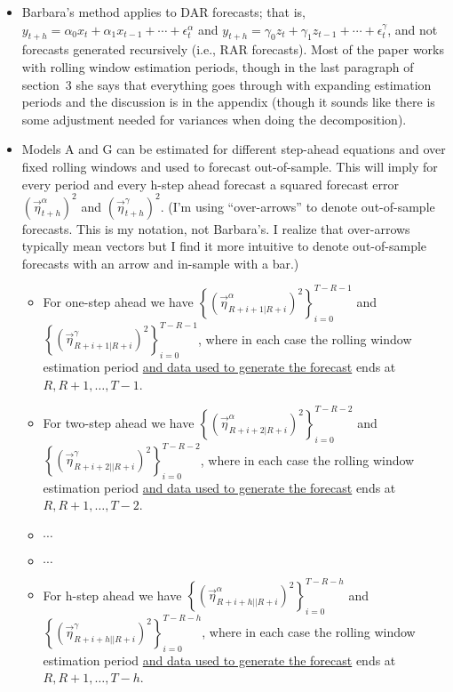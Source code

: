 \documentclass[11pt]{article}
\begin{document}
\begin{itemize}
\item Barbara's method applies to DAR forecasts; that is, $y_{t+h}=\alpha_{0}x_{t}+\alpha_{1}x_{t-1}+\cdots+\epsilon^{\alpha}_{t}$ and $y_{t+h}=\gamma_{0}z_{t}+\gamma_{1}z_{t-1}+\cdots+\epsilon^{\gamma}_{t}$, and not forecasts generated recursively (i.e., RAR forecasts).  Most of the paper works with rolling window estimation periods, though in the last paragraph of section~3 she says that everything goes through with expanding estimation periods and the discussion is in the appendix (though it sounds like there is some adjustment needed for variances when doing the decomposition).
\item Models A and G can be estimated for different step-ahead equations and over fixed rolling windows and used to forecast out-of-sample.  This will imply for every period and every h-step ahead forecast a squared forecast error $\left(\overrightarrow{\eta}^{\alpha}_{t+h}\right)^{2}$ and
 $\left(\overrightarrow{\eta}^{\gamma}_{t+h}\right)^{2}$.  (I'm using ``over-arrows'' to denote out-of-sample forecasts.  This is my notation, not Barbara's. I realize that over-arrows typically mean vectors but I find it more intuitive to denote out-of-sample forecasts with an arrow and in-sample with a bar.)
\begin{itemize}
\item For one-step ahead we have $\left\{\left(\overrightarrow{\eta}^{\alpha}_{R+i+1|R+i}\right)^{2}\right\}_{i=0}^{T-R-1}$ and $\left\{\left(\overrightarrow{\eta}^{\gamma}_{R+i+1|R+i}\right)^{2}\right\}_{i=0}^{T-R-1}$, where in each case the rolling window estimation period \underline{and data used to generate the forecast}
ends at $R, R+1, \dots, T-1$.
\item For two-step ahead we have $\left\{\left(\overrightarrow{\eta}^{\alpha}_{R+i+2|R+i}\right)^{2}\right\}_{i=0}^{T-R-2}$ and $\left\{\left(\overrightarrow{\eta}^{\gamma}_{R+i+2||R+i}\right)^{2}\right\}_{i=0}^{T-R-2}$, where in each case the rolling window estimation period \underline{and data used to generate the forecast} ends at $R, R+1, \dots, T-2$.
\item $\cdots$
\item $\cdots$
\item For h-step ahead we have $\left\{\left(\overrightarrow{\eta}^{\alpha}_{R+i+h||R+i}\right)^{2}\right\}_{i=0}^{T-R-h}$ and $\left\{\left(\overrightarrow{\eta}^{\gamma}_{R+i+h||R+i}\right)^{2}\right\}_{i=0}^{T-R-h}$, where in each case the rolling window estimation period \underline{and data used to generate the forecast} ends at $R, R+1, \dots, T-h$.

\end{itemize}
\end{itemize}
\end{document}
